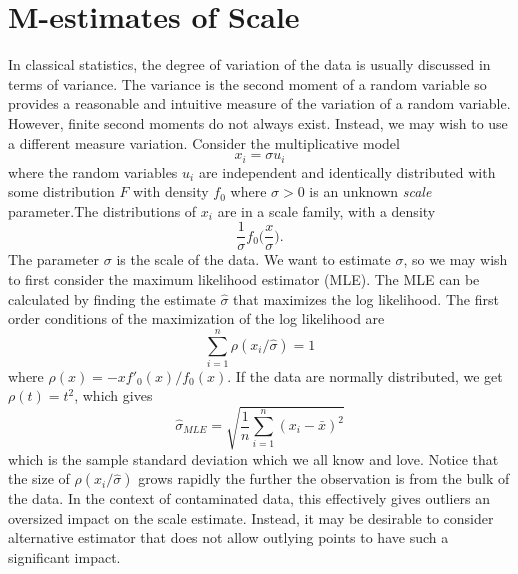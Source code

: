 
\section{M-estimates of Scale}
\label{sec:mScale}
In classical statistics, the degree of variation of the data is usually discussed in terms of variance. The variance is the second moment of a random variable so provides a reasonable and intuitive measure of the variation of a random variable. However, finite second moments do not always exist. Instead, we may wish to use a different measure variation. Consider the multiplicative model
\begin{equation}
    x_i = \sigma u_i
\end{equation}
where the random variables $u_i$ are independent and identically distributed with some distribution $F$ with density $f_0$ where $\sigma>0$ is an unknown \textit{scale} parameter.The distributions of $x_i$ are in a scale family, with a density
$$ \frac{1}{\sigma} f_0\bigg(\frac{x}{\sigma} \bigg).$$
The parameter $\sigma$ is the scale of the data. We want to estimate $\sigma$, so we may wish to first consider the maximum likelihood estimator (MLE). The MLE can be calculated by finding the estimate $\hat \sigma$ that maximizes the log likelihood. The first order conditions of the maximization of the log likelihood are
\begin{equation}
    \label{eq:mleScale}
    \sum_{i=1}^n \rho(x_i/\hat \sigma) = 1
\end{equation}
where $\rho(x) = -xf'_0(x)/f_0(x)$. If the data are normally distributed, we get $\rho(t) = t^2$, which gives 
\begin{equation}
    \hat \sigma_{MLE} = \sqrt{\frac{1}{n} \sum_{i=1}^n (x_i - \bar x)^2}
\end{equation}
which is the sample standard deviation which we all know and love. Notice that the size of $\rho(x_i/\hat \sigma)$ grows rapidly the further the observation is from the bulk of the data. In the context of contaminated data, this effectively gives outliers an oversized impact on the scale estimate. Instead, it may be desirable to consider alternative estimator that does not allow outlying points to have such a significant impact. 

